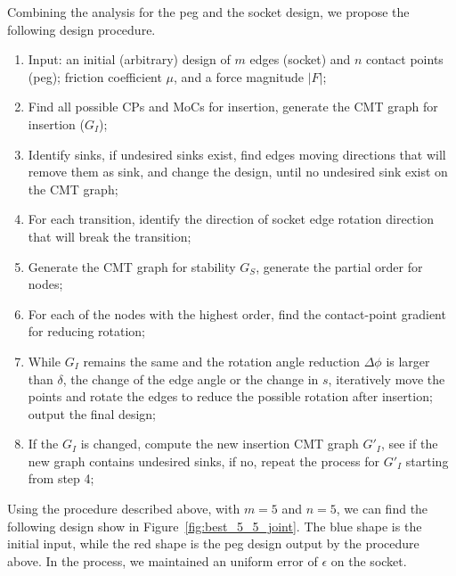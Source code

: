 \documentclass[11pt, twocolumn]{article}
\begin{document}


Combining the analysis for the peg and the socket design, we propose the following design procedure. 

\begin{enumerate}
\vspace{-1em}
\item Input: an initial (arbitrary) design of $m$ edges (socket) and $n$ contact points (peg); friction coefficient $\mu$, and a force magnitude $|F|$; 
\vspace{-1em}
\item Find all possible CPs and MoCs for insertion, generate the CMT graph for insertion ($G_I$); 
\vspace{-1em}
\item Identify sinks, if undesired sinks exist, find edges moving directions that will remove them as sink, and change the design, until no undesired sink exist on the CMT graph; 
\vspace{-1em}
\item For each transition, identify the direction of socket edge rotation direction that will break the transition; 
\vspace{-1em}
\item Generate the CMT graph for stability $G_S$, generate the partial order for nodes; 
\vspace{-1em}
\item For each of the nodes with the highest order, find the contact-point gradient for reducing rotation;
\vspace{-1em} 
\item While $G_I$ remains the same and the rotation angle reduction $\Delta\phi$ is larger than $\delta$, the change of the edge angle or the change in $s$, iteratively move the points and rotate the edges to reduce the possible rotation after insertion; output the final design; 
\vspace{-1em}
\item If the $G_I$ is changed, compute the new insertion CMT graph $G'_I$, see if the new graph contains undesired sinks, if no, repeat the process for $G'_I$ starting from step 4; 
\vspace{-1em}
\end{enumerate}



Using the procedure described above, with $m = 5$ and $n=5$, we can find the following design show in Figure~\ref{fig:best_5_5_joint}. The blue shape is the initial input, while the red shape is the peg design output by the procedure above. In the process, we maintained an uniform error of $\epsilon$ on the socket. 
\end{document}
